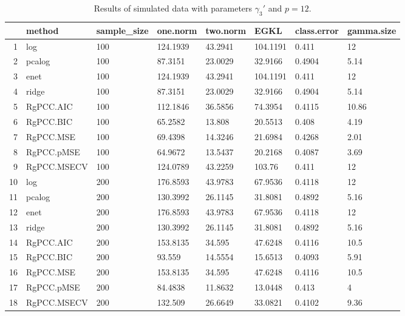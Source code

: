 \begin{table}[ht]
\centering
\begin{tabular}{rlllllll}
  \hline
 & method & sample\_size & one.norm & two.norm & EGKL & class.error & gamma.size \\ 
  \hline
1 & log & 100 & 124.1939 & 43.2941 & 104.1191 & 0.411 & 12 \\ 
  2 & pcalog & 100 & 87.3151 & 23.0029 & 32.9166 & 0.4904 & 5.14 \\ 
  3 & enet & 100 & 124.1939 & 43.2941 & 104.1191 & 0.411 & 12 \\ 
  4 & ridge & 100 & 87.3151 & 23.0029 & 32.9166 & 0.4904 & 5.14 \\ 
  5 & RgPCC.AIC & 100 & 112.1846 & 36.5856 & 74.3954 & 0.4115 & 10.86 \\ 
  6 & RgPCC.BIC & 100 & 65.2582 & 13.808 & 20.5513 & 0.408 & 4.19 \\ 
  7 & RgPCC.MSE & 100 & 69.4398 & 14.3246 & 21.6984 & 0.4268 & 2.01 \\ 
  8 & RgPCC.pMSE & 100 & 64.9672 & 13.5437 & 20.2168 & 0.4087 & 3.69 \\ 
  9 & RgPCC.MSECV & 100 & 124.0789 & 43.2259 & 103.76 & 0.411 & 12 \\ 
  10 & log & 200 & 176.8593 & 43.9783 & 67.9536 & 0.4118 & 12 \\ 
  11 & pcalog & 200 & 130.3992 & 26.1145 & 31.8081 & 0.4892 & 5.16 \\ 
  12 & enet & 200 & 176.8593 & 43.9783 & 67.9536 & 0.4118 & 12 \\ 
  13 & ridge & 200 & 130.3992 & 26.1145 & 31.8081 & 0.4892 & 5.16 \\ 
  14 & RgPCC.AIC & 200 & 153.8135 & 34.595 & 47.6248 & 0.4116 & 10.5 \\ 
  15 & RgPCC.BIC & 200 & 93.559 & 14.5554 & 15.6513 & 0.4093 & 5.91 \\ 
  16 & RgPCC.MSE & 200 & 153.8135 & 34.595 & 47.6248 & 0.4116 & 10.5 \\ 
  17 & RgPCC.pMSE & 200 & 84.4838 & 11.8632 & 13.0448 & 0.413 & 4 \\ 
  18 & RgPCC.MSECV & 200 & 132.509 & 26.6649 & 33.0821 & 0.4102 & 9.36 \\ 
   \hline
\end{tabular}
\caption{Results of simulated data with parameters $\gamma_3'$ and $p =12$. } 
\label{fig-3'-nonlead-12-metrics-p}
\end{table}
